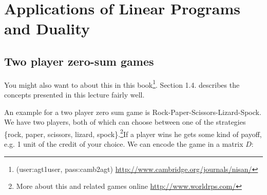 \section{Applications of Linear Programs and Duality}
\subsection{Two player zero-sum games}

You might also want to about this in this book\footnote{(user:agt1user, pass:camb2agt) \url{http://www.cambridge.org/journals/nisan/}}. Section 1.4. describes the concepts presented in this lecture fairly well.

An example for a two player zero sum game is Rock-Paper-Scissors-Lizard-Spock. We have two players, both of which can choose between one of the strategies \{rock, paper, scissors, lizard, spock\}.\footnote{More about this and related games online \url{http://www.worldrps.com/}}If a player wins he gets some kind of payoff, e.g. 1 unit of the credit of your choice. We can encode the game in a matrix $D$:


